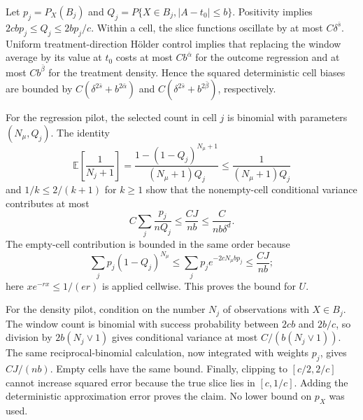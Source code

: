 Let \(p_j=P_X(B_j)\) and \(Q_j=P\{X\in B_j,\lvert A-t_0\rvert\le b\}\). Positivity implies \(2cbp_j\le Q_j\le2bp_j/c\). Within a cell, the slice functions oscillate by at most \(C\delta^{\bar s}\). Uniform treatment-direction Hölder control implies that replacing the window average by its value at \(t_0\) costs at most \(Cb^{\bar\alpha}\) for the outcome regression and at most \(Cb^{\bar\beta}\) for the treatment density. Hence the squared deterministic cell biases are bounded by \(C(\delta^{2\bar s}+b^{2\bar\alpha})\) and \(C(\delta^{2\bar s}+b^{2\bar\beta})\), respectively.

For the regression pilot, the selected count in cell \(j\) is binomial with parameters \((N_\mu,Q_j)\). The identity
\[
\mathbb E\!\left[\frac1{N_j+1}\right]
=\frac{1-(1-Q_j)^{N_\mu+1}}{(N_\mu+1)Q_j}
\le\frac1{(N_\mu+1)Q_j}
\]
and \(1/k\le2/(k+1)\) for \(k\ge1\) show that the nonempty-cell conditional variance contributes at most
\[
C\sum_j\frac{p_j}{nQ_j}\le\frac{C J}{nb}\le\frac{C}{nb\delta^d}.
\]
The empty-cell contribution is bounded in the same order because
\[
\sum_jp_j(1-Q_j)^{N_\mu}
\le\sum_jp_j e^{-2cN_\mu bp_j}
\le\frac{CJ}{nb};
\]
here \(xe^{-rx}\le1/(er)\) is applied cellwise. This proves the bound for \(U\).

For the density pilot, condition on the number \(N_j\) of observations with \(X\in B_j\). The window count is binomial with success probability between \(2cb\) and \(2b/c\), so division by \(2b(N_j\vee1)\) gives conditional variance at most \(C/(b(N_j\vee1))\). The same reciprocal-binomial calculation, now integrated with weights \(p_j\), gives \(CJ/(nb)\). Empty cells have the same bound. Finally, clipping to \([c/2,2/c]\) cannot increase squared error because the true slice lies in \([c,1/c]\). Adding the deterministic approximation error proves the claim. No lower bound on \(p_X\) was used.